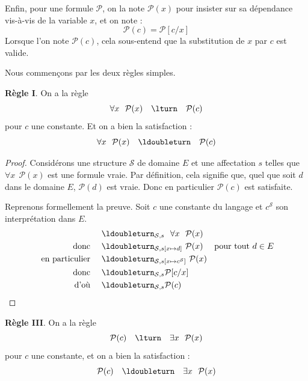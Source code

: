 \documentclass[11pt,class=report,crop=false]{standalone}
\begin{document}
Enfin, pour une formule $\mathcal{P}$, on la note $\mathcal{P}(x)$ pour insister sur sa dépendance vis-à-vis de la variable $x$, et on note :
\[
\mathcal{P}(c) = \mathcal{P}[c/x]
\]
Lorsque l'on note $\mathcal{P}(c)$, cela sous-entend que la substitution de $x$ par $c$ est valide.

Nous commençons par les deux règles simples.

\medskip

\textbf{Règle I}. On a la règle  
\[
\forall x \ \ \mathcal{P}(x)  \quad \lturn \quad \mathcal{P}(c)
\]
pour $c$ une constante. Et on a bien la satisfaction :
\[
\forall x \ \ \mathcal{P}(x)  \quad \ldoubleturn \quad \mathcal{P}(c)
\]


\begin{proof}
Considérons une structure $\mathcal{S}$ de domaine $E$ et une affectation $s$ telles que
\og{}$\forall x \ \ \mathcal{P}(x)$\fg{} est une formule vraie. 
Par définition, cela signifie que, quel que soit $d$ dans le domaine $E$, $\mathcal{P}(d)$ est vraie. Donc en particulier $\mathcal{P}(c)$ est satisfaite.

Reprenons formellement la preuve.
Soit $c$ une constante du langage et $c^{\mathcal{S}}$ son interprétation dans $E$.
\begin{align*}
				& \ldoubleturn_{\mathcal{S},s} \ \  \forall x \ \ \mathcal{P}(x)\\									
\text{ donc } \quad  & \ldoubleturn_{\mathcal{S},s[x \mapsto d]} \ \mathcal{P}(x) \quad \text{ pour tout $d \in E$} \\
\text{ en particulier }  \quad   & \ldoubleturn_{\mathcal{S},s[x \mapsto c^{\mathcal{S}}]} \ \mathcal{P}(x) \\
\text{ donc }  \quad   & \ldoubleturn_{\mathcal{S},s} \mathcal{P}[c/x] \\
\text{ d'où }  \quad   & \ldoubleturn_{\mathcal{S},s} \mathcal{P}(c)
\end{align*} 	
\end{proof}


\medskip

\textbf{Règle III}. On a la règle  
\[
\mathcal{P}(c)  \quad \lturn \quad \exists x \ \ \mathcal{P}(x)
\]
pour $c$ une constante, et on a bien la satisfaction :
\[
\mathcal{P}(c)  \quad \ldoubleturn \quad \exists x \ \ \mathcal{P}(x)
\]
\end{document}
